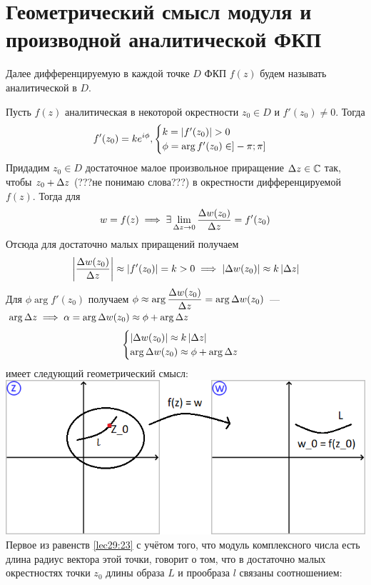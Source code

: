 \documentclass[../../main.tex]{subfiles}
\begin{document}
\section{Геометрический смысл модуля и производной аналитической ФКП}

Далее дифференцируемую в каждой точке $ D $ ФКП $ f(z) $
будем называть аналитической в $ D $.

Пусть $ f(z) $ аналитическая в некоторой окрестности $ z_0 \in D $ и 
$ f'(z_0) \neq 0 $. Тогда
\[
f'(z_0) = k e^{i\phi},
\begin{cases}
	k = \left|{f'(z_0)}\right| > 0\\
	\phi = \arg f'(z_0) \in ]-\pi; \pi]
\end{cases}
\]
Придадим $ z_0 \in D $ достаточное малое произвольное приращение 
$ \Delta z \in \mathbb{C} $ так, чтобы $ z_0 + \Delta z $ (???не понимаю слова???) в окрестности
дифференцируемой $ f(z) $. Тогда для
\[
w = f(z) \implies \exists \lim\limits_{\Delta z \to 0} 
\dfrac{\Delta w(z_0)}{\Delta z} = f'(z_0)
\]
Отсюда для достаточно малых приращений получаем
\[
\left|{\dfrac{\Delta w(z_0)}{\Delta z}}\right| \approx \left|{f'(z_0)}\right| = k > 0
\implies \left|{\Delta w(z_0)}\right| \approx k\left|{\Delta z}\right|
\]
Для $ \phi \arg f'(z_0) $ получаем $ \phi \approx \arg 
\dfrac{\Delta w(z_0)}{\Delta z} = \arg \Delta w(z_0)  $~---$ \arg \Delta z \implies
\alpha = \arg \Delta w(z_0) \approx \phi + \arg \Delta z
$
\begin{equation}
\label{lec29:23}
\begin{cases}
	\left|{\Delta w (z_0)}\right| \approx k\left|{\Delta z}\right|\\
	\arg \Delta w(z_0) \approx \phi + \arg \Delta z
\end{cases}
\end{equation}
имеет следующий геометрический смысл:\\
\includegraphics{lec29_1}\\
Первое из равенств \eqref{lec29:23} с учётом того, что модуль комплексного числа
есть длина радиус вектора этой точки, говорит о том, что в достаточно 
малых окрестностях точки $ z_0 $ длины образа $ L $ и прообраза $ l $ связаны соотношением:
\end{document}
